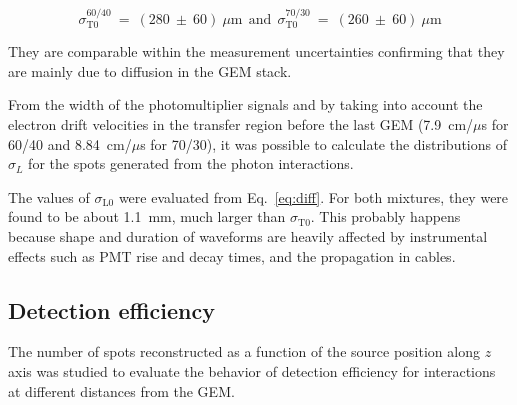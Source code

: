 \documentclass[a4paper,11pt]{article}
\begin{document}
$$
\sigma^{60/40}_{\mathrm{T0}}~=~(280~\pm~60)~\mu{\mathrm{m}}
{\mathrm{~~and~~}} 
\sigma^{70/30}_{\mathrm{T0}}~=~(260~\pm~60)~\mu{\mathrm{m}}
$$
 
 They are comparable within the measurement uncertainties confirming that they are mainly due to diffusion in the GEM stack.

From the width of the photomultiplier signals and by taking into account the electron drift velocities in the transfer region before the last GEM (7.9~cm/$\mu$s for 60/40 and	8.84~cm/$\mu$s for 70/30), it was possible to calculate the distributions of $\sigma_L$ for the spots generated from the photon interactions. 

%
The values of $\sigma_{\mathrm{L0}}$ were evaluated from Eq.~\ref{eq:diff}. For both mixtures, they were found to be about 1.1~mm, much larger than $\sigma_{\mathrm{T0}}$. This probably happens because shape and duration of waveforms are heavily affected by instrumental effects such as PMT rise and decay times, and the propagation in cables. 



\subsection{Detection efficiency}
\label{cap:detect}

The number of spots reconstructed as a function of the source position along $z$ axis was studied to evaluate the behavior of detection efficiency for interactions at different distances from the GEM.
\end{document}
